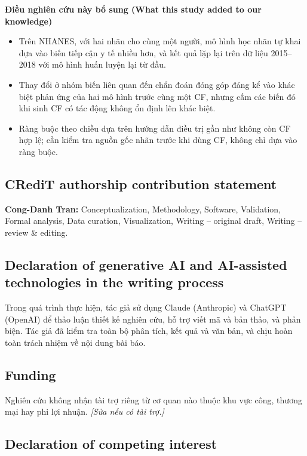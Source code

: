 \documentclass[9pt,a4paper]{extarticle}
\providecommand{\tightlist}{\setlength{\itemsep}{0pt}\setlength{\parskip}{0pt}}
\begin{document}
\textbf{Điều nghiên cứu này bổ sung (What this study added to our
knowledge)}

\begin{itemize}
\tightlist
\item
  Trên NHANES, với hai nhãn cho cùng một người, mô hình học nhãn tự khai
  dựa vào biến tiếp cận y tế nhiều hơn, và kết quả lặp lại trên dữ liệu
  2015--2018 với mô hình huấn luyện lại từ đầu.
\item
  Thay đổi ở nhóm biến liên quan đến chẩn đoán đóng góp đáng kể vào khác
  biệt phản ứng của hai mô hình trước cùng một CF, nhưng cấm các biến đó
  khi sinh CF có tác động không ổn định lên khác biệt.
\item
  Ràng buộc theo chiều dựa trên hướng dẫn điều trị gần như không còn CF
  hợp lệ; cần kiểm tra nguồn gốc nhãn trước khi dùng CF, không chỉ dựa
  vào ràng buộc.
\end{itemize}

\subsection{CRediT authorship contribution statement}

\textbf{Cong-Danh Tran:} Conceptualization, Methodology, Software,
Validation, Formal analysis, Data curation, Visualization, Writing --
original draft, Writing -- review \& editing.

\subsection{Declaration of generative AI and AI-assisted technologies in
the writing process}

Trong quá trình thực hiện, tác giả sử dụng Claude (Anthropic) và ChatGPT
(OpenAI) để thảo luận thiết kế nghiên cứu, hỗ trợ viết mã và bản thảo,
và phản biện. Tác giả đã kiểm tra toàn bộ phân tích, kết quả và văn bản,
và chịu hoàn toàn trách nhiệm về nội dung bài báo.

\subsection{Funding}

Nghiên cứu không nhận tài trợ riêng từ cơ quan nào thuộc khu vực công,
thương mại hay phi lợi nhuận. \emph{{[}Sửa nếu có tài trợ.{]}}

\subsection{Declaration of competing interest}
\end{document}
